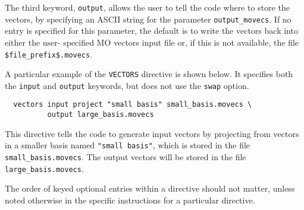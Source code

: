The third keyword, \verb+output+, allows the user to tell the code
where to store the vectors, by specifying an ASCII string for the
parameter {\tt output\_movecs}.  If no entry is specified for this
parameter, the default is to write the vectors back into either the
user- specified MO vectors input file or, if this is not available,
the file \verb+$file_prefix$.movecs+.

A particular example of the \verb+VECTORS+ directive is shown below.
It specifies both the \verb+input+ and \verb+output+ keywords, but
does not use the \verb+swap+ option.
\begin{verbatim}
  vectors input project "small basis" small_basis.movecs \
          output large_basis.movecs
\end{verbatim}
This directive tells the code to generate input vectors by projecting
from vectors in a smaller basis named \verb+"small basis"+, which is
stored in the file \verb+small_basis.movecs+.  The output vectors will
be stored in the file \verb+large_basis.movecs+.

The order of keyed optional entries within a directive should not
matter, unless noted otherwise in the specific instructions for a
particular directive.
